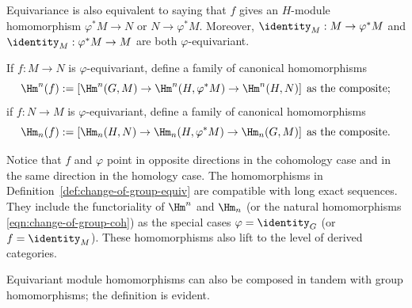 Equivariance is also equivalent to saying that $f$ gives an $H$-module
homomorphism $\varphi^*M\to N$ or $N\to\varphi^*M$. Moreover,
$\identity_M:M\to\varphi^*M$ and
$\identity_M:\varphi^*M\to M$ are both $\varphi$-equivariant.

\begin{definition}\label{def:change-of-group-equiv}
	If $f:M\to N$ is $\varphi$-equivariant, define a family of canonical
	homomorphisms
	\[ \Hm^n(f) := \left[ \Hm^n(G, M) \to \Hm^n(H, \varphi^* M) \to \Hm^n(H, N) \right] \;\text{as the composite}; \]
	if $f:N\to M$ is $\varphi$-equivariant, define a family of canonical
	homomorphisms
	\[ \Hm_n(f) := \left[ \Hm_n(H, N) \to \Hm_n(H, \varphi^* M) \to \Hm_n(G, M) \right] \;\text{as the composite}. \]
\end{definition}

Notice that $f$ and $\varphi$ point in opposite directions in the cohomology
case and in the same direction in the homology case. The homomorphisms in
Definition~\ref{def:change-of-group-equiv} are compatible with long exact
sequences. They include the functoriality of $\Hm^n$ and $\Hm_n$ (or the
natural homomorphisms \eqref{eqn:change-of-group-coh}) as the special cases
$\varphi=\identity_G$ (or $f=\identity_M$). These homomorphisms also lift to
the level of derived categories.

Equivariant module homomorphisms can also be composed in tandem with group
homomorphisms; the definition is evident.

